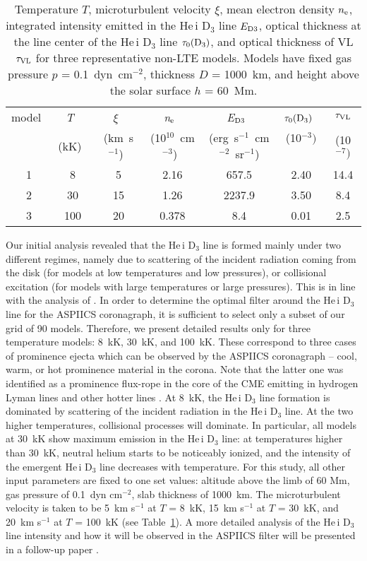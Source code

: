 \documentclass[namedreferences]{solarphysics}
\begin{document}
\begin{article}
\begin{table}  %
\caption{Temperature $T$, microturbulent velocity $\xi$, mean electron density $n_{\rm e}$, integrated intensity 
emitted in the He\,{\sc i} D$_{3}$ line $E_{\rm D3}$, optical thickness at the line center of the 
He\,{\sc i} D$_{3}$ line $\tau_{0}(\rm D_{3})$, and optical thickness of VL 
$\tau_{\rm VL}$ for three representative non-LTE models. Models have fixed gas pressure $p$ = 0.1~dyn~cm$^{-2}$, 
thickness $D$ = 1000~km, and height above the solar surface $h$ = 60~Mm.}
\label{t-ms}
\begin{tabular}{ccccccc} 
 \hline model~&{\it T}~&{\it $\xi$}~&{\it n$_{\rm e}$}~&{\it E$_{\rm D3}$}~& {\it $\tau_{0}(\rm D_{3})$}~&{\it $\tau_{\rm VL}$} \\
           &(kK)~&(km~s$^{-1}$)~&(10$^{10}$~cm$^{-3}$)~&(erg~s$^{-1}$~cm$^{-2}$~sr$^{-1}$)&(10$^{-3})$~&(10$^{-7})$\\
 \hline  1&8&5&2.16&657.5&2.40&14.4\\
         2&30&15&1.26&2237.9&3.50&8.4\\
         3&100&20&0.378&8.4&0.01&2.5\\
 \hline
\end{tabular}
\end{table} 

Our initial analysis revealed that the He\,{\sc i} D$_{3}$ line is formed mainly under two different regimes, namely due to scattering of the incident 
radiation coming from the disk (for models at low temperatures and low pressures), or collisional excitation (for models with large temperatures or large 
pressures). This is in line with the analysis of . In order to determine the optimal filter around the 
He\,{\sc i} D$_{3}$ line for the ASPIICS coronagraph, it is sufficient to select only a subset of our grid of 90 models.
Therefore, we present detailed results only for three temperature models: 8~kK, 30~kK, and 100~kK. These correspond to three cases 
of prominence ejecta which can be observed by the ASPIICS coronagraph -- cool,  warm, or hot prominence material in the corona.
Note that the latter one was identified as a prominence flux-rope in the core of the CME emitting in hydrogen Lyman lines and other hotter lines 
\cite{Hei16,Jej17}. At 8~kK, the He\,{\sc i} D$_{3}$ line formation is dominated by scattering of the incident radiation in the He\,{\sc i} D$_{3}$ line. At 
the two higher temperatures, 
collisional processes will dominate. In particular, all models at 30~kK show maximum emission in the He\,{\sc i} D$_{3}$ line: at  temperatures higher than 
30~kK, neutral helium starts to be noticeably ionized, and the intensity of the emergent He\,{\sc i} D$_{3}$ line decreases with temperature. 
For this study, all other input parameters are fixed to one set values: altitude above the limb of 60 Mm, gas pressure of 0.1~dyn cm$^{-2}$, slab 
thickness of 1000~km. The microturbulent velocity is taken to be 5~km s$^{-1}$ at $T$ = 8~kK, 15~km s$^{-1}$ at $T$ = 30~kK, and 20~km s$^{-1}$ 
at $T$ = 100~kK (see Table~\ref{t-ms}). A more detailed analysis of the He\,{\sc i} D$_{3}$ line intensity and how it will be observed in the 
ASPIICS filter will be presented in a follow-up paper \cite{Lab18}.


\end{article}
\end{document}
